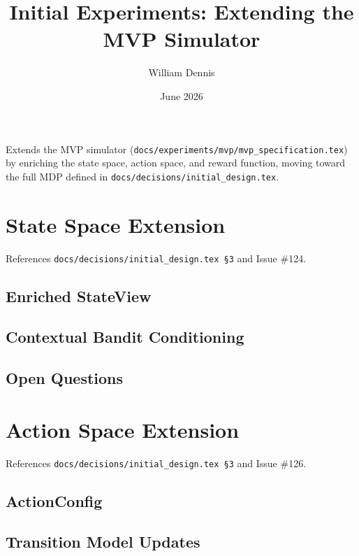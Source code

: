 \documentclass[11pt]{article}
\title{Initial Experiments: Extending the MVP Simulator}
\author{William Dennis}
\date{June 2026}
\begin{document}
\maketitle

Extends the MVP simulator (\texttt{docs/experiments/mvp/mvp\_specification.tex}) by enriching
the state space, action space, and reward function, moving toward the full
MDP defined in \texttt{docs/decisions/initial\_design.tex}.

\section{State Space Extension}
\label{sec:state}

References \texttt{docs/decisions/initial\_design.tex \S3} and Issue \#124.


\subsection{Enriched StateView}



\subsection{Contextual Bandit Conditioning}



\subsection{Open Questions}



\section{Action Space Extension}
\label{sec:action}

References \texttt{docs/decisions/initial\_design.tex \S3} and Issue \#126.


\subsection{ActionConfig}



\subsection{Transition Model Updates}
\end{document}
